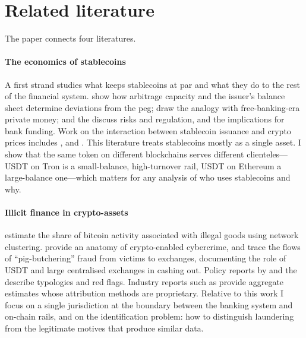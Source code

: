 \section{Related literature}\label{sec:literature}

The paper connects four literatures.

\paragraph{The economics of stablecoins}
A first strand studies what keeps stablecoins at par and what they do to the rest of the financial system.
\citet{lyons2023stable} show how arbitrage capacity and the issuer's balance sheet determine deviations from the peg;
\citet{gorton2023wildcat} draw the analogy with free-banking-era private money; \citet{arner2020stablecoins} and the
\citet{bis2025aer} discuss risks and regulation, and \citet{liao2022stablecoins} the implications for bank funding.
Work on the interaction between stablecoin issuance and crypto prices includes \citet{griffin2020tether},
\citet{ante2021issuance} and \citet{kristoufek2021tethered}. This literature treats stablecoins mostly as a single
asset. I show that the same token on different blockchains serves different clienteles---USDT on Tron is a small-balance,
high-turnover rail, USDT on Ethereum a large-balance one---which matters for any analysis of who uses stablecoins and why.

\paragraph{Illicit finance in crypto-assets}
\citet{foley2019sex} estimate the share of bitcoin activity associated with illegal goods using network clustering.
\citet{cong2023anatomy} provide an anatomy of crypto-enabled cybercrime, and \citet{griffin2024slavery} trace the flows
of ``pig-butchering'' fraud from victims to exchanges, documenting the role of USDT and large centralised exchanges in
cashing out. Policy reports by \citet{unodc2024casinos,unodc2025inflection} and the
\citet{fatf2020redflags,fatf2023cyberfraud,fatf2025targeted} describe typologies and red flags. Industry reports such as
\citet{chainalysis2025crime} provide aggregate estimates whose attribution methods are proprietary. Relative to this
work I focus on a single jurisdiction at the boundary between the banking system and on-chain rails, and on the
identification problem: how to distinguish laundering from the legitimate motives that produce similar data.

